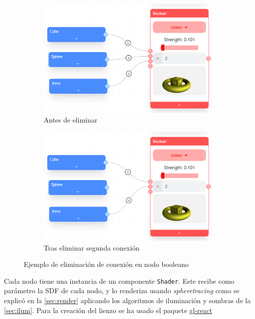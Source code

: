 \begin{figure}[!h]
    \centering
    \begin{subfigure}[b]{0.45\textwidth}
        \centering
        \includegraphics[width=\textwidth]{Plantilla-TFG-master/img/booleanBorrar1.png}
        \caption{Antes de eliminar}
    \end{subfigure}
    \hspace{15pt}
    \begin{subfigure}[b]{0.45\textwidth}
        \centering
        \includegraphics[width=\textwidth]{Plantilla-TFG-master/img/booleanBorrar2.png}
        \caption{Tras eliminar segunda conexión}
    \end{subfigure}
    \hfill
     \caption{Ejemplo de eliminación de conexión en nodo booleano}
\end{figure}

Cada nodo tiene una instancia de un componente \texttt{Shader}. Este recibe como parámetro la SDF de cada nodo, y lo renderiza usando \textit{spheretracing} como se explicó en la \autoref{sec:render} aplicando los algoritmos de iluminación y sombras de la \autoref{sec:ilum}. Para la creación del lienzo se ha usado el paquete \href{https://github.com/gre/gl-react}{gl-react}

